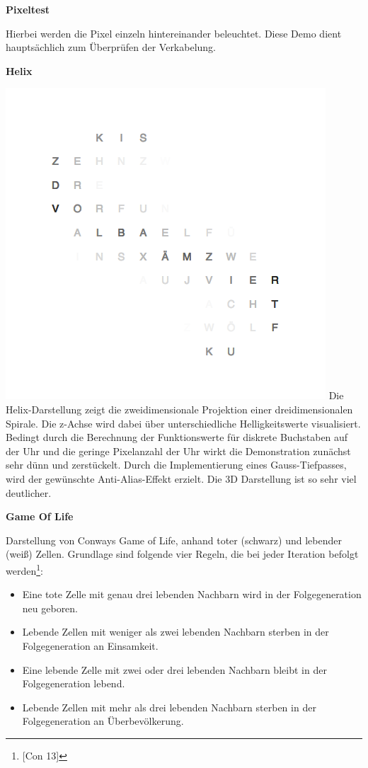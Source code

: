 \begin{multicols}{2}
\textbf{Pixeltest}

Hierbei werden die Pixel einzeln hintereinander beleuchtet. Diese Demo dient hauptsächlich zum Überprüfen der Verkabelung.

\textbf{Helix}

{
    \centering
    \includegraphics[width=\columnwidth]{Abbildungen/Software/Demo/Helix}
}
Die Helix-Darstellung zeigt die zweidimensionale Projektion einer dreidimensionalen Spirale. Die z-Achse wird dabei über unterschiedliche Helligkeitswerte visualisiert.
Bedingt durch die Berechnung der Funktionswerte für diskrete Buchstaben auf der Uhr und die geringe Pixelanzahl der Uhr wirkt die Demonstration zunächst sehr dünn und zerstückelt. Durch die Implementierung eines Gauss-Tiefpasses, wird der gewünschte Anti-Alias-Effekt erzielt. Die 3D Darstellung ist so sehr viel deutlicher.

\textbf{Game Of Life}

Darstellung von Conways Game of Life, anhand toter (schwarz) und lebender (weiß) Zellen.
Grundlage sind folgende vier Regeln, die bei jeder Iteration befolgt werden\footnote{[Con 13]}:
\begin{itemize}
\item Eine tote Zelle mit genau drei lebenden Nachbarn wird in der Folgegeneration neu geboren.
\item Lebende Zellen mit weniger als zwei lebenden Nachbarn sterben in der Folgegeneration an Einsamkeit.
\item Eine lebende Zelle mit zwei oder drei lebenden Nachbarn bleibt in der Folgegeneration lebend.
\item Lebende Zellen mit mehr als drei lebenden Nachbarn sterben in der Folgegeneration an Überbevölkerung.
\end{itemize}


\end{multicols}
